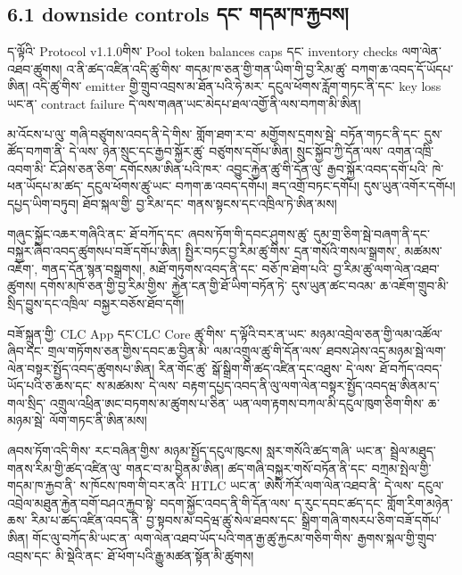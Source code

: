\documentclass[11pt]{article}
\begin{document}
\subsection*{6.1 downside controls དང་ གདམ་ཁ་རྐྱབས།}

ད་ལྟོའི་ Protocol v1.1.0གིས་ Pool token balances caps དང་ inventory checks ལག་ལེན་འཐབ་ཚུགས། འ་ནི་ཚད་འཛིན་འདི་ཚུ་གིས་ གདམ་ཁ་ཅན་གྱི་གན་ཡིག་གི་བྱ་རིམ་ཚུ་ བཀག་ཆ་འབད་དོ་ཡོདཔ་ཨིན། འདི་ཚུ་གིས་ emitter གྱི་གྲུབ་འབྲས་མ་ཐོན་པའི་ཧེ་མར་ དངུལ་ཕོགས་རློག་གཏང་ནི་དང་ key loss ཡང་ན་ contract failure དེ་ལས་གཞན་ཡང་མེདཔ་ཐལ་འགྱོ་ནི་ལས་བཀག་མི་ཨིན།

མ་འོངས་པ་ལུ་ གཞི་བཙུགས་འབད་ནི་དེ་གིས་ གློག་ཐག་ར་བ་ མགྱོགས་དྲགས་སྦེ་ བཏོན་གཏང་ནི་དང་ དུས་ཚོད་བཀག་ནི་ དེ་ལས་ ཉེན་སྲུང་དང་རྒྱབ་སྐྱོར་ཚུ་ བཙུགས་དགོཔ་ཨིན། སྲུང་སྐྱོབ་ཀྱི་དོན་ལས་ འགན་འཁྲི་འབག་མི་ ངོ་ཤེས་ཅན་ཅིག་ དགོངསམ་ཨིན་པའི་ཁར་ འབྱུང་རྐྱེན་ཚུ་གི་དོན་ལུ་ རྒྱབ་སྐྱོར་འབད་དགོ་པའི་ ཁེ་ཕན་ཡོདཔ་མ་ཚད་ དངུལ་ཕོགས་ཚུ་ཡང་ བཀག་ཆ་འབད་དགོཔ། ཟད་འགྲོ་བཏང་དགོཔ། དུས་ཡུན་འགོར་དགོཔ། དཔྱད་ཡིག་བཏུབ། ཐོབ་སྐལ་གྱི་ བྱ་རིམ་དང་ གནས་སྟངས་དང་འཁྲིལ་ཏེ་ཨིན་མས།

གཞུང་སྐྱོང་འཆར་གཞིའི་ནང་ ཐོ་བཀོད་དང་ ཞབས་ཏོག་གི་དབང་ཤུགས་ཚུ་ དུམ་གྲ་ཅིག་སྦེ་བཞག་ནི་དང་ བསྐྱར་ཞིབ་འབད་ཚུགསཔ་བཟོ་དགོཔ་ཨིན། སྤྱིར་བཏང་བྱ་རིམ་ཚུ་གིས་ དྲན་གསོའི་གསལ་སྒྲགས་, མཚམས་འཇོག་, གནད་དོན་སྙན་བསྒྲགས།, མཐོ་གཏུགས་འབད་ནི་དང་ བཅོ་ཁ་ཐེག་པའི་ བྱ་རིམ་ཚུ་ལག་ལེན་འཐབ་ཚུགས། དགོས་མཁོ་ཅན་གྱི་བྱ་རིམ་གྱིས་ རྐྱེན་ངན་གྱི་ཐོ་ཡིག་བཏོན་ཏེ་ དུས་ཡུན་ཚང་བའམ་ ཆ་འཇོག་གྲུབ་མི་ སྲིད་བྱུས་དང་འཁྲིལ་ བསྐྱར་བཅོས་ཐོབ་དགོ།

བཟོ་སྐྲུན་གྱི་ CLC App དང་CLC Core ཚུ་གིས་ ད་ལྟོའི་བར་ན་ཡང་ མཉམ་འབྲེལ་ཅན་གྱི་ལམ་འཚོལ་ཞིབ་དང་ གྲལ་གཏོགས་ཅན་གྱིས་དབང་ཆ་བྱིན་མི་ ལམ་འགྲུལ་ཚུ་གི་དོན་ལས་ ཐབས་ཤེས་འདྲ་མཉམ་སྦེ་ལག་ལེན་བསྟར་སྤྱོད་འབད་ཚུགསཔ་ཨིན། རིན་གོང་ཚུ་ སྒོ་སྒྲིག་གི་ཚད་འཛིན་དང་འཐུས་ དེ་ལས་ ཐོ་བཀོད་འབད་ཡོད་པའི་ཅ་ཆས་དང་ ས་མཚམས་ དེ་ལས་ བརྟག་དཔྱད་འབད་ནི་ལུ་ལག་ལེན་བསྟར་སྤྱོད་འབདཝ་ཨིནམ་ད་ གལ་སྲིད་ འགྲུལ་འཕྲིན་ཨང་བཏགས་མ་ཚུགས་པ་ཅིན་ ཡན་ལག་རྟགས་བཀལ་མི་དངུལ་ཁུག་ཅིག་གིས་ ཆ་མཉམ་སྦེ་ ལོག་གཏང་ནི་ཨིན་མས།

ཞབས་ཏོག་འདི་གིས་ རང་བཞིན་གྱིས་ མཉམ་སྤྱོད་དངུལ་ཁུངས། སླར་གསོའི་ཚད་གཞི་ ཡང་ན་ སྦྲེལ་མཐུད་གནས་རིམ་གྱི་ཚད་འཛིན་ལུ་ གནང་བ་མ་བྱིནམ་ཨིན། ཚད་གཞི་བསྐྱར་གསོ་བཏོན་ནི་དང་ བཀྲམ་སྤེལ་གྱི་གདམ་ཁ་རྐྱབ་ནི་ ས་ཁོངས་ཁག་གི་བར་ནའི་ HTLC ཡང་ན་ ཨེསི་ཀོརོ་ལག་ལེན་འཐབ་ནི་ དེ་ལས་ དངུལ་འབྲེལ་མཐུན་རྐྱེན་བགོ་བཤའ་རྐྱབ་སྟེ་ བདག་སྐྱོང་འབད་ནི་གི་དོན་ལས་ ད་རུང་དབང་ཚད་དང་ གློག་རིག་མཉེན་ཆས་ རིམ་པ་ཚད་འཛིན་འབད་ནི་ བྱ་སྟབས་མ་བདེཝ་ཚུ་སེལ་ཐབས་དང་ སྒྲིག་གཞི་གསརཔ་ཅིག་བཟོ་དགོཔ་ཨིན། གོང་ལུ་བཀོད་མི་ཡང་ན་ ལག་ལེན་འཐབ་ཡོད་པའི་གན་རྒྱ་ཚུ་རྐྱངམ་གཅིག་གིས་ རྒྱགས་སྐལ་གྱི་གྲུབ་འབྲས་དང་ མི་སྡེའི་ནང་ ཐོ་ཕོག་པའི་རྒྱུ་མཚན་སྟོན་མི་ཚུགས།
\end{document}
